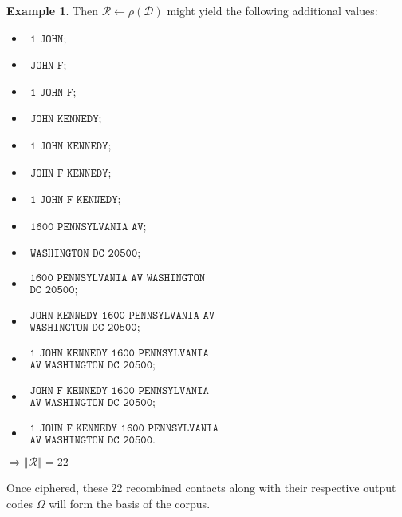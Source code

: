 \documentclass[twoside,twocolumn]{article}
\newcommand{\norm}[1]{\left\Vert#1\right\Vert}
\theoremstyle{definition}
\newtheorem{example}{Example}
\theoremstyle{remark}
\begin{document}
\begin{example}
    Then $\mathcal{R} \gets \rho(\mathcal{D})$ might yield the following additional values:
    \begin{small} \begin{itemize}
        \item $~~\texttt{1 JOHN}$;
        \item $~~\texttt{JOHN F}$;
        \item $~~\texttt{1 JOHN F}$;
        \item $~~\texttt{JOHN KENNEDY}$;
        \item $~~\texttt{1 JOHN KENNEDY}$;
        \item $~~\texttt{JOHN F KENNEDY}$;
        \item $~~\texttt{1 JOHN F KENNEDY}$;
        \item $~~\texttt{1600 PENNSYLVANIA AV}$;
        \item $~~\texttt{WASHINGTON DC 20500}$;
        \item $\begin{array}{l} \texttt{1600 PENNSYLVANIA AV WASHINGTON} \\ \texttt{DC 20500}; \end{array}$
        \item $\begin{array}{l} \texttt{JOHN KENNEDY 1600 PENNSYLVANIA AV} \\\texttt{WASHINGTON DC 20500}; \end{array}$
        \item $\begin{array}{l} \texttt{1 JOHN KENNEDY 1600 PENNSYLVANIA} \\ \texttt{AV WASHINGTON DC 20500}; \end{array}$
        \item $\begin{array}{l} \texttt{JOHN F KENNEDY 1600 PENNSYLVANIA} \\ \texttt{AV WASHINGTON DC 20500}; \end{array}$
        \item $\begin{array}{l} \texttt{1 JOHN F KENNEDY 1600 PENNSYLVANIA} \\ \texttt{AV WASHINGTON DC 20500}. \end{array}$
    \end{itemize} \end{small}
    $\Longrightarrow \norm{\mathcal{R}} = 22$

    Once ciphered, these 22 recombined contacts along with their respective output codes $\Omega$ will form the basis of the corpus.
\end{example}
\end{document}
